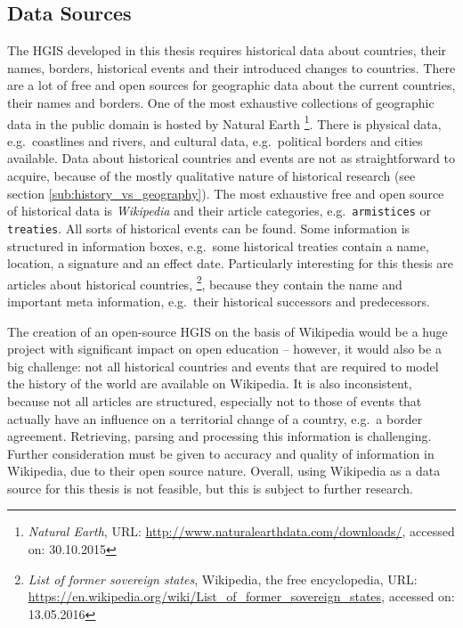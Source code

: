 
\subsection{Data Sources} %
\label{sub:data_sources}

The HGIS developed in this thesis requires historical data about countries, their names, borders, historical events and their introduced changes to countries. There are a lot of free and open sources for geographic data about the current countries, their names and borders. One of the most exhaustive collections of geographic data in the public domain is hosted by Natural Earth
\footnote{
  \textit{Natural Earth},
  URL: \url{http://www.naturalearthdata.com/downloads/},
  accessed on: 30.10.2015
}.
There is physical data, e.g.\ coastlines and rivers, and cultural data, e.g.\ political borders and cities available.
Data about historical countries and events are not as straightforward to acquire, because of the mostly qualitative nature of historical research (see section \ref{sub:history_vs_geography}). The most exhaustive free and open source of historical data is \emph{Wikipedia} and their article categories, e.g.\ \texttt{armistices} or \texttt{treaties}.
All sorts of historical events can be found. Some information is structured in information boxes, e.g.\ some historical treaties contain a name, location, a signature and an effect date. Particularly interesting for this thesis are articles about historical countries,
\footnote{
  \textit{List of former sovereign states},
  Wikipedia, the free encyclopedia,
  URL: \url{https://en.wikipedia.org/wiki/List_of_former_sovereign_states},
  accessed on: 13.05.2016
},
because they contain the name and important meta information, e.g.\ their historical successors and predecessors.

The creation of an open-source HGIS on the basis of Wikipedia would be a huge project with significant impact on open education -- however, it would also be a big challenge: not all historical countries and events that are required to model the history of the world are available on Wikipedia. It is also inconsistent, because not all articles are structured, especially not to those of events that actually have an influence on a territorial change of a country, e.g.\ a border agreement. Retrieving, parsing and processing this information is challenging.
Further consideration must be given to accuracy and quality of information in Wikipedia, due to their open source nature.
Overall, using Wikipedia as a data source for this thesis is not feasible, but this is subject to further research.

